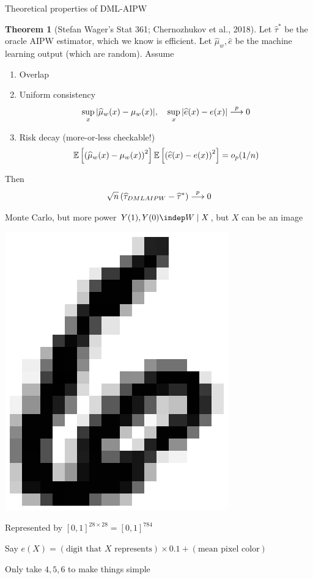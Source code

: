\documentclass[10pt,aspectratio=169,handout]{beamer}
\theoremstyle{definition}
\newtheorem{thm}{Theorem}
\begin{document}
\begin{frame}{Theoretical properties of DML-AIPW}
  \begin{thm}[Stefan Wager's Stat 361; Chernozhukov et al., 2018]
    Let $\hat \tau^*$ be the \alert{oracle AIPW} estimator, which we know
    is efficient. Let $\hat \mu_w, \hat e$ be the machine learning output 
    (which are random). Assume \begin{enumerate}
      \item Overlap 
      \item Uniform consistency \[
      \sup_{x} |\widehat \mu_w(x) - \mu_w(x)|,\quad \sup_x|\widehat e(x) - e(x)|
      \overset{p}{\longrightarrow} 0
      \]
      \item Risk decay (more-or-less checkable!) \[
      \mathbb{E}\left[{\left({\widehat \mu_w(x) - \mu_w(x)}\right)^2}\right] \mathbb{E}\left[{\left({\widehat e(x) -
      e
      (x)}\right)^2}\right] = o_p(1/n)
      \]
    \end{enumerate}
    Then \[
    \sqrt{n}\left({\widehat\tau_{DMLAIPW} - \widehat\tau^*}\right) \overset{p}{\longrightarrow} 0
    \]
  \end{thm}
\end{frame}


\end{document}
